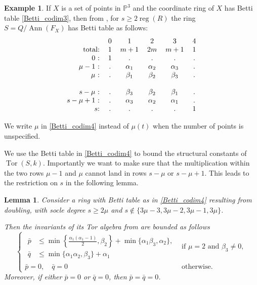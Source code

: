 \documentclass[reqno]{amsart}
\DeclareMathOperator{\Ann}{Ann}
\DeclareMathOperator{\Tor}{Tor}
\DeclareMathOperator{\reg}{reg}
\renewcommand{\P}{\mathbb{P}}
\theoremstyle{plain} %
\newtheorem{lemma}[theorem]{Lemma}
\theoremstyle{definition}
\newtheorem{example}[theorem]{Example}
\theoremstyle{remark}
\begin{document}
\begin{example}\label{ex}
If $X$ is a set of points in $\P^3$ and the coordinate ring of $X$ has Betti table \eqref{Betti_codim3}, then from , for $s\geq 2\reg(R)$ the ring $S=Q/\Ann(F_X)$  has Betti table as follows: 
\begin{equation}\label{Betti_codim4}
\begin{tabular}{r c c c c c}
 & 0 & 1 & 2 & 3 & 4 \\
total: & 1 & $ m+1$ & $2m$ & $m+1$ &1\\
0 : & 1 & . & . & .&. \\
$\mu-1$ : & . & $\alpha_1$ & $\alpha_2$ & $\alpha_3$ &.\\
$\mu$ : & . & $\beta_1$ & $\beta_2$ & $\beta_3$ &.\\
\\
$s-\mu$ : & . & $\beta_3$ & $\beta_2$ & $\beta_1$ &.\\
$s-\mu+1$ : & . & $\alpha_3$ & $\alpha_2$ & $\alpha_1$ &.\\
$s$:& .& .& . & . & 1
\end{tabular}
\end{equation}

We write $\mu$ in \eqref{Betti_codim4} instead of $\mu(t)$ when the number of points is unspecified. 
\end{example}

We use the Betti table in  \eqref{Betti_codim4}  to bound the structural constants of  $\Tor(S,k)$. Importantly we want to make sure that the multiplication within the two rows $\mu-1$ and $\mu$ cannot land in rows $s-\mu$ or $s-\mu+1$. 
This leads to the restriction on $s$ in the following lemma.


\begin{lemma} \label{bounds_for_codim4}
    Consider a ring with Betti table as in \eqref{Betti_codim4} resulting from doubling, with socle degree $s\geq 2\mu$ and $s\notin\{3\mu-3,3\mu-2,3\mu-1,3\mu\}$. 
    
    Then the invariants of its Tor algebra from  are bounded as follows
    \[
\begin{cases}
\begin{aligned}
\bar p
  &\leq
  \min\left\{\frac{\alpha_1(\alpha_1-1)}{2},\beta_2\right\}
  +\min\{\alpha_1\beta_3,\alpha_2\},\\
\bar q
  &\leq
  \min\{\alpha_1\alpha_2,\beta_3\}+\alpha_1
\end{aligned}
& \text{if }\mu=2\text{ and }\beta_3\neq0,\\[1ex]
\bar p=0,\quad \bar q=0
& \text{otherwise.}
\end{cases}
\]
Moreover, if either $\bar p=0$ or $\bar q=0$, then $\bar p=\bar q=0$.

\end{lemma}
\end{document}
